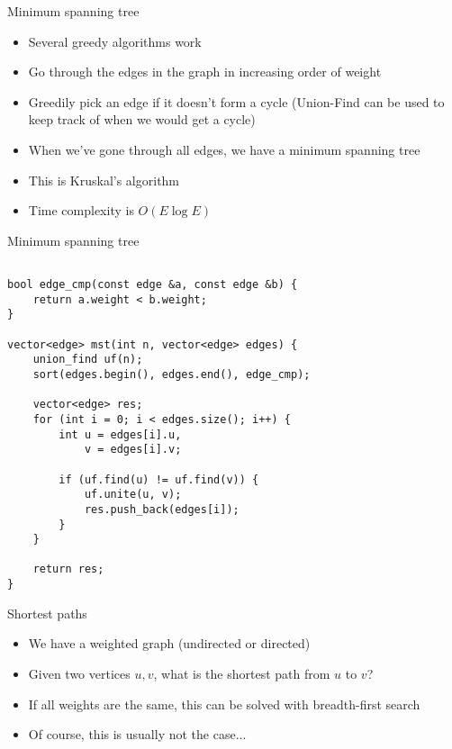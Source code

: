 \documentclass[12pt,t]{beamer}
\newcommand{\bi}{\begin{itemize}}
\newcommand{\ei}{\end{itemize}}
\begin{document}
\begin{frame}{Minimum spanning tree}
    \vspace{20pt}
    \bi
        \item Several greedy algorithms work
        \vspace{10pt}
        \item Go through the edges in the graph in increasing order of weight
        \item Greedily pick an edge if it doesn't form a cycle (Union-Find can be used to keep track of when we would get a cycle)
        \item When we've gone through all edges, we have a minimum spanning tree
        \vspace{10pt}
        \item This is Kruskal's algorithm
        \item Time complexity is $O(E \log E)$
    \ei
\end{frame}

\begin{frame}[fragile]{Minimum spanning tree}
    \begin{verbatim}

bool edge_cmp(const edge &a, const edge &b) {
    return a.weight < b.weight;
}

vector<edge> mst(int n, vector<edge> edges) {
    union_find uf(n);
    sort(edges.begin(), edges.end(), edge_cmp);

    vector<edge> res;
    for (int i = 0; i < edges.size(); i++) {
        int u = edges[i].u,
            v = edges[i].v;

        if (uf.find(u) != uf.find(v)) {
            uf.unite(u, v);
            res.push_back(edges[i]);
        }
    }

    return res;
}
    \end{verbatim}
\end{frame}


\begin{frame}{Shortest paths}
    \vspace{40pt}
    \bi
        \item We have a weighted graph (undirected or directed)
        \item Given two vertices $u,v$, what is the shortest path from $u$ to $v$?
        \vspace{10pt}
        \item If all weights are the same, this can be solved with breadth-first search
        \item Of course, this is usually not the case...
    \ei
\end{frame}
\end{document}
